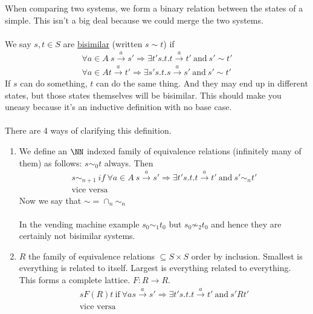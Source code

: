 \documentclass[../598comp.tex]{subfiles}
\begin{document}
\begin{definition}
  When comparing two systems, we form a binary relation between the states of a
  simple. This isn't a big deal because we could merge the two systems.
  \\\\
  We say $s, t \in S$ are \ul{bisimilar} (written $s \sim t$) if 
  \begin{gather*}
    \forall a \in A \ s \overset{a}{\to} s' \Rightarrow \exists t' s.t. t
    \overset{a}{\to} t' \ \text{and} \ s' \sim t' \\
    \forall a \in A t \overset{a}{\to} t' \Rightarrow \exists s' s.t. s
    \overset{a}{\to} s' \ \text{and} \ s' \sim t'
  \end{gather*}
  If $s$ can do something, $t$ can do the same thing. And they may end up in
  different states, but those states themselves will be bisimilar. This should
  make you uneasy because it's an inductive definition with no base case.
  \\\\
  There are 4 ways of clarifying this definition.
  \begin{enumerate}
  \item 
    We define an $\NN$ indexed family of equivalence relations (infinitely many
    of them) as follows: $s \sim_0 t$ always. Then
    \begin{gather*}
      s \sim_{n + 1} \ if \ \forall a \in A \ s \overset{a}{\to} s' \Rightarrow \exists t' s.t. t \overset{a}{\to} t' \ \text{and} \ s' \sim_n t' \\
      \text{vice versa}
    \end{gather*}
    Now we say that $\sim = \cap_n \sim_n$
    \\\\
    In the vending machine example $s_0 \sim_1 t_0$ but $s_0 \not\sim_2 t_0$ and
    hence they are certainly not bisimilar systems.
  \item
    $R$ the family of equivalence relations $\subseteq S \times S$ order by
    inclusion. Smallest is everything is related to itself. Largest is
    everything related to everything. This forms a complete lattice. $F: R \to
    R$.
    \begin{gather*}
      s F(R) t \ \text{if} \ \forall a s \overset{a}{\to} s' \Rightarrow \exists
      t' s.t. t \overset{a}{\to} t' \ \text{and} \ s' R t' \\
      \text{vice versa}
    \end{gather*}

\end{enumerate}
\end{definition}
\end{document}
